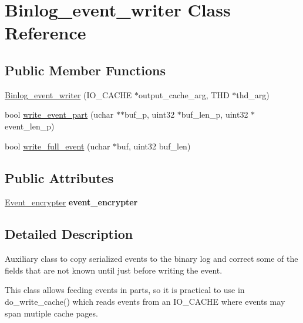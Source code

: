 \hypertarget{classBinlog__event__writer}{}\section{Binlog\+\_\+event\+\_\+writer Class Reference}
\label{classBinlog__event__writer}
\subsection*{Public Member Functions}
\begin{DoxyCompactItemize}
\item 
\mbox{\hyperlink{classBinlog__event__writer_abdbdd3929b68adde1c58d85362e79a54}{Binlog\+\_\+event\+\_\+writer}} (I\+O\+\_\+\+C\+A\+C\+HE $\ast$output\+\_\+cache\+\_\+arg, T\+HD $\ast$thd\+\_\+arg)
\item 
bool \mbox{\hyperlink{classBinlog__event__writer_a51e3a81384cdd0830e6d08a0676df008}{write\+\_\+event\+\_\+part}} (uchar $\ast$$\ast$buf\+\_\+p, uint32 $\ast$buf\+\_\+len\+\_\+p, uint32 $\ast$event\+\_\+len\+\_\+p)
\item 
bool \mbox{\hyperlink{classBinlog__event__writer_aaec80471064cbf01336851346860ee09}{write\+\_\+full\+\_\+event}} (uchar $\ast$buf, uint32 buf\+\_\+len)
\end{DoxyCompactItemize}
\subsection*{Public Attributes}
\begin{DoxyCompactItemize}
\item 
\mbox{\label{classBinlog__event__writer_ae3f6e7df74ca248704d03fc16ad950da}} 
\mbox{\hyperlink{classEvent__encrypter}{Event\+\_\+encrypter}} {\bfseries event\+\_\+encrypter}
\end{DoxyCompactItemize}


\subsection{Detailed Description}
Auxiliary class to copy serialized events to the binary log and correct some of the fields that are not known until just before writing the event.

This class allows feeding events in parts, so it is practical to use in do\+\_\+write\+\_\+cache() which reads events from an I\+O\+\_\+\+C\+A\+C\+HE where events may span mutiple cache pages.

